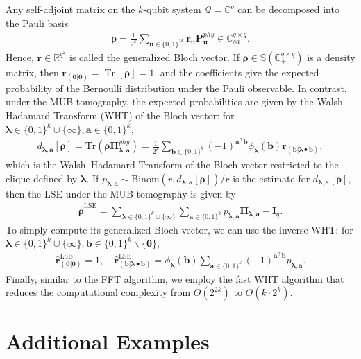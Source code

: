 \documentclass[noinfoline]{imsart}\setcounter{tocdepth}{2}
\renewcommand{\b}[1]{\mathbb{#1}} %
\newcommand{\m}[1]{\mathbf{#1}} %
\renewcommand{\c}[1]{\mathcal{#1}} %
\newcommand{\mb}[1]{\boldsymbol{#1}} %
\newcommand{\tr}[1]{\operatorname{Tr}\left[#1\right]}
\theoremstyle{plain}
\begin{document}
\begin{appendix}
Any self-adjoint matrix on the $k$-qubit system $\c{Q} = \b{C}^{q}$ can be decomposed into the Pauli basis
\begin{align*}
    \mb{\rho} = \frac{1}{2^{k}} \sum_{\m{u} \in \{0, 1\}^{2k}} \m{r}_{\m{u}} \m{P}_{\m{u}}^{phy}  \in \b{C}_{sa}^{q \times q}.
\end{align*}
Hence, $\m{r} \in \b{R}^{q^{2}}$ is called the generalized Bloch vector. If $\mb{\rho} \in \b{S}(\b{C}_{+}^{q \times q})$ is a density matrix, then $\m{r}_{(\m{0} \vert \m{0})} = \tr{\mb{\rho}}= 1$, and the coefficients give the expected probability of the Bernoulli distribution under the Pauli observable. In contrast, under the MUB tomography, the expected probabilities are given by the Walsh--Hadamard Transform (WHT) of the Bloch vector: for $\mb{\lambda} \in \{0, 1\}^{k} \cup \{\infty\},  \m{a} \in \{0, 1\}^{k}$,
\begin{align*}
    d_{\mb{\lambda}, \m{a}}[\mb{\rho}] = \text{Tr}(\mb{\rho} \m{\Pi}_{\mb{\lambda}, \m{a}}^{phy}) = \frac{1}{2^k} \sum_{\m{b} \in \{0,1\}^k} (-1)^{\m{a}^{\top}\m{b}} \phi_{\mb{\lambda}}(\m{b}) \m{r}_{(\m{b} | \mb{\lambda} \bullet \m{b})},
\end{align*}
which is the Walsh--Hadamard Transform of the Bloch vector restricted to the clique defined by $\mb{\lambda}$.
If $p_{\mb{\lambda}, \m{a}} \sim \text{Binom}(r, d_{\mb{\lambda}, \m{a}}[\mb{\rho}])/r$ is the estimate for $d_{\mb{\lambda}, \m{a}}[\mb{\rho}]$, then the LSE under the MUB tomography is given by
\begin{align*}
    \hat{\mb{\rho}}^{\text{LSE}} = \sum_{\mb{\lambda} \in \{0, 1\}^{k} \cup \{\infty\}} \sum_{\m{a} \in \{0, 1\}^{k}} p_{\mb{\lambda}, \m{a}} \m{\Pi}_{\mb{\lambda}, \m{a}} - \m{I}_{q}.
\end{align*}
To simply compute its generalized Bloch vector, we can use the inverse WHT: for $\mb{\lambda} \in \{0, 1\}^{k} \cup \{\infty\},  \m{b} \in \{0, 1\}^{k} \backslash \{\m{0}\}$,
\begin{align*}
    \hat{\m{r}}_{(\m{0} \vert \m{0})}^{\text{LSE}} = 1, \quad \hat{\m{r}}_{(\m{b} | \mb{\lambda} \bullet \m{b})}^{\text{LSE}} = \phi_{\mb{\lambda}}(\m{b}) \sum_{\m{a} \in \{0,1\}^k} (-1)^{\m{a}^{\top}\m{b}} p_{\mb{\lambda}, \m{a}}.
\end{align*}
Finally, similar to the FFT algorithm, we employ the fast WHT algorithm that reduces the computational complexity from $O(2^{2k})$ to $O(k \cdot 2^{k})$.

\section{Additional Examples}



\end{appendix}
\end{document}
